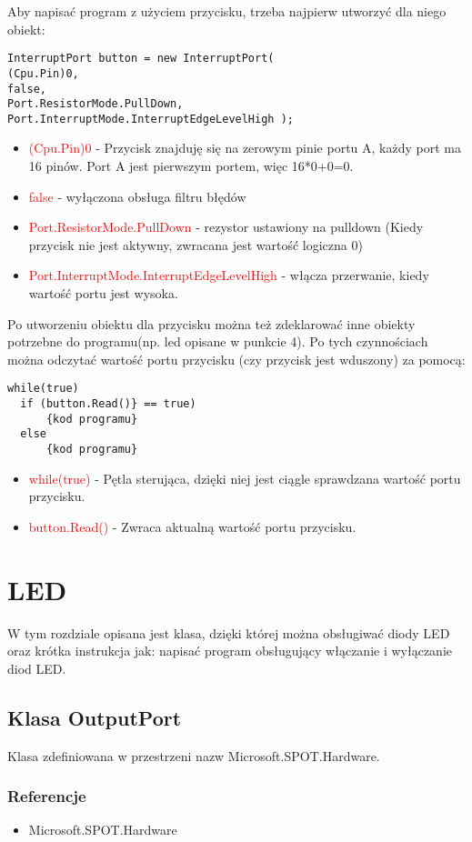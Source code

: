 \documentclass{article}
\begin{document}
Aby napisać program z użyciem przycisku, trzeba najpierw utworzyć dla niego obiekt:
\begin{lstlisting}[frame=single] 
InterruptPort button = new InterruptPort( 
(Cpu.Pin)0, 
false, 
Port.ResistorMode.PullDown,
Port.InterruptMode.InterruptEdgeLevelHigh );
\end{lstlisting}
\begin{itemize}
\item \textcolor{red}{(Cpu.Pin)0} - Przycisk znajduję się na zerowym pinie portu A, każdy port ma 16 pinów. Port A jest pierwszym portem, więc 16*0+0=0.
\item \textcolor{red}{false} - wyłączona obsługa filtru błędów
\item \textcolor{red}{Port.ResistorMode.PullDown} - rezystor ustawiony na pulldown (Kiedy przycisk nie jest aktywny, zwracana jest wartość logiczna 0)
\item \textcolor{red}{Port.InterruptMode.InterruptEdgeLevelHigh} - włącza przerwanie, kiedy wartość portu jest wysoka.
\end{itemize}
Po utworzeniu obiektu dla przycisku można też zdeklarować inne obiekty potrzebne do programu(np. led opisane w punkcie 4). Po tych czynnościach można odczytać wartość portu przycisku (czy przycisk jest wduszony) za pomocą:
\begin{lstlisting}[frame=single] 
while(true)
  if (button.Read()} == true)
      {kod programu}
  else
      {kod programu}
\end{lstlisting}
\begin{itemize}
\item \textcolor{red}{while(true)} - Pętla sterująca, dzięki niej jest ciągle sprawdzana wartość portu przycisku.
\item \textcolor{red}{button.Read()} - Zwraca aktualną wartość portu przycisku.
\end{itemize}
 
 
\section{LED}
W tym rozdziale opisana jest klasa, dzięki której można obsługiwać diody LED oraz krótka instrukcja jak: napisać program obsługujący włączanie i wyłączanie diod LED.
\subsection{Klasa OutputPort}
Klasa zdefiniowana w przestrzeni nazw Microsoft.SPOT.Hardware.
\subsubsection{Referencje}
\begin{itemize}
\item Microsoft.SPOT.Hardware
\end{itemize}
\end{document}
